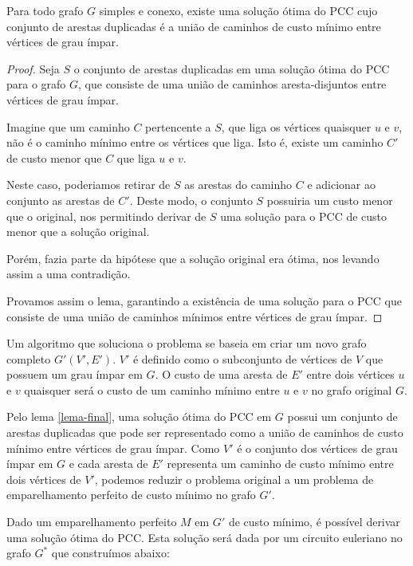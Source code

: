 \begin{lemma}
    \label{lema-final}
    Para todo grafo $G$ simples e conexo, existe uma solução ótima do PCC cujo conjunto de arestas duplicadas é a união de caminhos de custo mínimo entre vértices de grau ímpar.
\end{lemma}

\begin{proof}
    Seja $S$ o conjunto de arestas duplicadas em uma solução ótima do PCC para o grafo $G$, que consiste de uma união de caminhos aresta-disjuntos entre vértices de grau ímpar.

    Imagine que um caminho $C$ pertencente a $S$, que liga os vértices quaisquer $u$ e $v$, não é o caminho mínimo entre os vértices que liga. 
    Isto é, existe um caminho $C'$ de custo menor que $C$ que liga $u$ e $v$.

    Neste caso, poderiamos retirar de $S$ as arestas do caminho $C$ e adicionar ao conjunto as arestas de $C'$. Deste modo, o conjunto $S$ possuiria um custo menor que o original, nos permitindo derivar de $S$ uma solução para o PCC de custo menor que a solução original.

    Porém, fazia parte da hipótese que a solução original era ótima, nos levando assim a uma contradição.

    Provamos assim o lema, garantindo a existência de uma solução para o PCC que consiste de uma união de caminhos mínimos entre vértices de grau ímpar.

\end{proof}

Um algoritmo que soluciona o problema se baseia em criar um novo grafo completo $G'(V', E')$. 
$V'$ é definido como o subconjunto de vértices de $V$ que possuem um grau ímpar em $G$. 
O custo de uma aresta de $E'$ entre dois vértices $u$ e $v$ quaisquer será o custo de um caminho mínimo entre $u$ e $v$ no grafo original $G$.


Pelo lema \ref{lema-final}, uma solução ótima do PCC em $G$ possui um conjunto de arestas duplicadas que pode ser representado como a união de caminhos de custo mínimo entre vértices de grau ímpar. 
Como $V'$ é o conjunto dos vértices de grau ímpar em $G$ e cada aresta de $E'$ representa um caminho de custo mínimo entre dois vértices de $V'$, podemos reduzir o problema original a um problema de emparelhamento perfeito de custo mínimo no grafo $G'$.

Dado um emparelhamento perfeito $M$ em $G'$ de custo mínimo, é possível derivar uma solução ótima do PCC. Esta solução será dada por um circuito euleriano no grafo $G^*$ que construímos abaixo:

